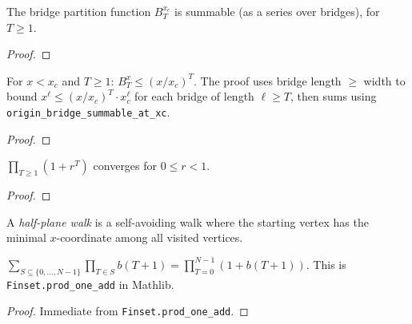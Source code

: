 \begin{theorem}\label{thm:bridge_summable}
\leanok
{}
  The bridge partition function $B_T^{x_c}$ is summable (as a series over
  bridges), for $T \geq 1$.
\end{theorem}
\begin{proof}
\leanok
{}
\end{proof}

\begin{theorem}\label{thm:bridge_decay}
\leanok
{}
  For $x < x_c$ and $T \geq 1$: $B_T^x \leq (x/x_c)^T$.
  The proof uses bridge length $\geq$ width to bound
  $x^\ell \leq (x/x_c)^T \cdot x_c^\ell$ for each bridge of length $\ell \geq T$,
  then sums using \texttt{origin\_bridge\_summable\_at\_xc}.
\end{theorem}
\begin{proof}
\leanok
{}
\end{proof}

\begin{theorem}\label{thm:prod_conv}
\leanok
  $\prod_{T \geq 1}(1 + r^T)$ converges for $0 \leq r < 1$.
\end{theorem}
\begin{proof}
\leanok
\end{proof}

\begin{definition}\label{def:half_plane}
\leanok
{}
  A \emph{half-plane walk} is a self-avoiding walk where the starting vertex
  has the minimal $x$-coordinate among all visited vertices.
\end{definition}

\begin{theorem}\label{thm:subset_product}
\leanok
  $\sum_{S \subseteq \{0,\ldots,N-1\}} \prod_{T \in S} b(T+1)
  = \prod_{T=0}^{N-1} (1 + b(T+1)).$
  This is \texttt{Finset.prod\_one\_add} in Mathlib.
\end{theorem}
\begin{proof}
\leanok
  Immediate from \texttt{Finset.prod\_one\_add}.
\end{proof}

